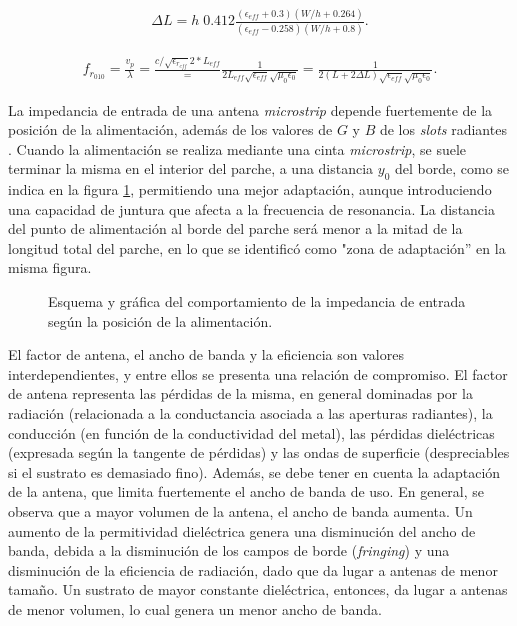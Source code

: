 \begin{align}
	\Delta L = h\; 0.412 \frac{(\epsilon_{eff}+0.3)(W/h + 0.264)}{(\epsilon_{eff}-0.258)(W/h +0.8)}.
	\label{eq:deltaL-antena-microstrip}
\end{align}

\begin{align}
	f_{{r}_{010}} = \frac{v_p}{\lambda} = \frac{c/\sqrt{\epsilon_{r_{eff}}}{2*L_{eff}}} = \frac{1}{2 L_{eff} \sqrt{\epsilon_{eff}} \sqrt{\mu_0 \epsilon_0}} = \frac{1}{2 (L+2 \Delta L) \sqrt{\epsilon_{eff}} \sqrt{\mu_0 \epsilon_0}}.
	\label{eq:frec-resonancia-modelo-linea-microstrip}
\end{align}

La impedancia de entrada de una antena \textit{microstrip} depende fuertemente de la posición de la alimentación, además de los valores de $G$ y $B$ de los \textit{slots} radiantes \cite{Balanis:Advanced}. Cuando la alimentación se realiza mediante una cinta \textit{microstrip}, se suele terminar la misma en el interior del parche, a una distancia $y_0$ del borde, como se indica en la figura \ref{fig:antema-microstrip-inset}, permitiendo una mejor adaptación, aunque introduciendo una capacidad de juntura que afecta a la frecuencia de resonancia. La distancia del punto de alimentación al borde del parche será menor a la mitad de la longitud total del parche, en lo que se identificó como "zona de adaptación'' en la misma figura.

\begin{figure} [H]
	\centering
	\caption{Esquema y gráfica del comportamiento de la impedancia de entrada según la posición de la alimentación.}
	\label{fig:antema-microstrip-inset}
\end{figure}


El factor de antena, el ancho de banda y la eficiencia son valores interdependientes, y entre ellos se presenta una relación de compromiso. El factor de antena representa las pérdidas de la misma, en general dominadas por la radiación (relacionada a la conductancia asociada a las aperturas radiantes), la conducción (en función de la conductividad del metal), las pérdidas dieléctricas (expresada según la tangente de pérdidas) y las ondas de superficie (despreciables si el sustrato es demasiado fino). Además, se debe tener en cuenta la adaptación de la antena, que limita fuertemente el ancho de banda de uso. En general, se observa que \cite{Balanis:Theory} a mayor volumen de la antena, el ancho de banda aumenta. Un aumento de la permitividad dieléctrica genera una disminución del ancho de banda, debida a la disminución de los campos de borde (\textit{fringing}) y una disminución de la eficiencia de radiación, dado que da lugar a antenas de menor tamaño. Un sustrato de mayor constante dieléctrica, entonces, da lugar a antenas de menor volumen, lo cual genera un menor ancho de banda.

